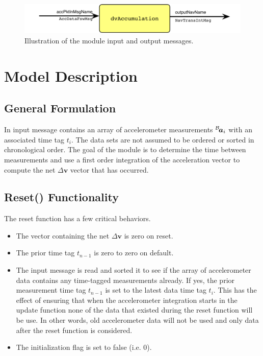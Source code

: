 

\begin{figure}[h]
	\centerline{
		\includegraphics{Figures/moduleImg}
	}
	\caption{Illustration of the module input and output messages.}
	\label{fig:moduleImg}
\end{figure}


\section{Model Description}
\subsection{General Formulation}
In input message contains an array of accelerometer measurements $\leftexp{B}{\bm a_{i}}$ with an associated time tag $t_{i}$.  The data sets are not assumed to be ordered or sorted in chronological order.  The goal of the module is to determine the time between measurements and use a first order integration of the acceleration vector to compute the net $\Delta\bm v$ vector that has occurred.


\subsection{Reset() Functionality}
The reset function has a few critical behaviors.  
\begin{itemize}
	\item The vector containing the net $\Delta \bm v$ is zero on reset.
	\item The prior time tag $t_{n-1}$ is zero to zero on default.
	\item The input message is read and sorted it to see if the array of accelerometer data contains any time-tagged measurements already.  If yes, the prior measurement time tag $t_{n-1}$ is set to the latest data time tag $t_{i}$.  This has the effect of ensuring that when the accelerometer integration starts in the update function none of the data that existed during the reset function will be use.  In other words, old accelerometer data will not be used and only data after the reset function is considered.
	\item The initialization flag is set to false (i.e. 0).
\end{itemize}


